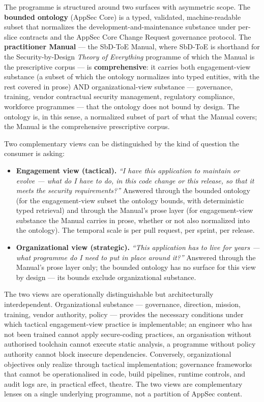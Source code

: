\documentclass[
]{article}
\providecommand{\tightlist}{%
  \setlength{\itemsep}{0pt}\setlength{\parskip}{0pt}}
\begin{document}
The programme is structured around two surfaces with asymmetric scope.
The \textbf{bounded ontology} (AppSec Core) is a typed, validated,
machine-readable subset that normalizes the development-and-maintenance
substance under per-slice contracts and the AppSec Core Change Request
governance protocol. The \textbf{practitioner Manual} --- the SbD-ToE
Manual, where SbD-ToE is shorthand for the Security-by-Design
\emph{Theory of Everything} programme of which the Manual is the
prescriptive corpus --- is \textbf{comprehensive}: it carries both
engagement-view substance (a subset of which the ontology normalizes
into typed entities, with the rest covered in prose) AND
organizational-view substance --- governance, training, vendor
contractual security management, regulatory compliance, workforce
programmes --- that the ontology does not bound by design. The ontology
is, in this sense, a normalized subset of part of what the Manual
covers; the Manual is the comprehensive prescriptive corpus.

Two complementary views can be distinguished by the kind of question the
consumer is asking:

\begin{itemize}
\tightlist
\item
  \textbf{Engagement view (tactical).} \emph{``I have this application
  to maintain or evolve --- what do I have to do, in this code change or
  this release, so that it meets the security requirements?''} Answered
  through the bounded ontology (for the engagement-view subset the
  ontology bounds, with deterministic typed retrieval) and through the
  Manual's prose layer (for engagement-view substance the Manual carries
  in prose, whether or not also normalized into the ontology). The
  temporal scale is per pull request, per sprint, per release.
\item
  \textbf{Organizational view (strategic).} \emph{``This application has
  to live for years --- what programme do I need to put in place around
  it?''} Answered through the Manual's prose layer only; the bounded
  ontology has no surface for this view by design --- its bounds exclude
  organizational substance.
\end{itemize}

The two views are operationally distinguishable but architecturally
interdependent. Organizational substance --- governance, direction,
mission, training, vendor authority, policy --- provides the necessary
conditions under which tactical engagement-view practice is
implementable; an engineer who has not been trained cannot apply
secure-coding practices, an organisation without authorised toolchain
cannot execute static analysis, a programme without policy authority
cannot block insecure dependencies. Conversely, organizational
objectives only realize through tactical implementation; governance
frameworks that cannot be operationalised in code, build pipelines,
runtime controls, and audit logs are, in practical effect, theatre. The
two views are complementary lenses on a single underlying programme, not
a partition of AppSec content.
\end{document}
